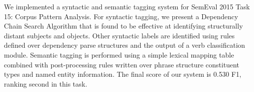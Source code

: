 We implemented a syntactic and semantic tagging system for SemEval 2015 Task 15: Corpus Pattern Analysis. For syntactic tagging, we present a Dependency Chain Search Algorithm that is found to be effective at identifying structurally distant subjects and objects. Other syntactic labels are identified using rules defined over dependency parse structures and the output of a verb classification module. Semantic tagging is performed using a simple lexical mapping table combined with post-processing rules written over phrase structure constituent types and named entity information. The final score of our system is 0.530 F1, ranking second in this task.
